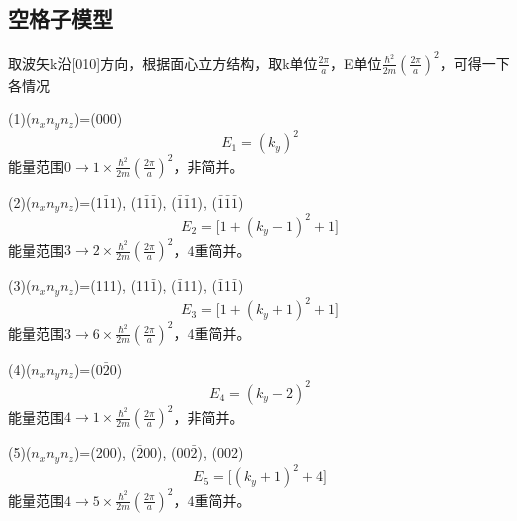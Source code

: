 \documentclass{article}
\begin{document}
\subsection{空格子模型}
取波矢k沿[010]方向，根据面心立方结构，取k单位$ \frac{2\pi}{a} $，E单位$ \frac{\hbar^2}{2m}(\frac{2\pi}{a})^2 $，可得一下各情况


(1)($ n_xn_yn_z $)=(000)
\begin{equation}
	E_1=(k_y)^2
\end{equation}
能量范围$ 0\rightarrow 1 \times \frac{\hbar^2}{2m}(\frac{2\pi}{a})^2 $，非简并。


(2)($ n_xn_yn_z $)=(1$\bar{1}1$), (1$\bar{1}$$\bar{1}$), ($\bar{1}$$\bar{1}$1), ($\bar{1}$$\bar{1}$$\bar{1}$)
\begin{equation}
	E_2=\big[1+(k_y-1)^2+1\big]
\end{equation}
能量范围$ 3\rightarrow 2 \times \frac{\hbar^2}{2m}(\frac{2\pi}{a})^2 $，4重简并。


(3)($ n_xn_yn_z $)=(111), (11$\bar{1}$), ($\bar{1}$11), ($\bar{1}$1$\bar{1}$)
\begin{equation}
	E_3=\big[1+(k_y+1)^2+1\big]
\end{equation}
能量范围$ 3\rightarrow 6 \times \frac{\hbar^2}{2m}(\frac{2\pi}{a})^2 $，4重简并。


(4)($ n_xn_yn_z $)=(0$\bar{2}0$)
\begin{equation}
	E_4=(k_y-2)^2
\end{equation}
能量范围$ 4\rightarrow 1 \times \frac{\hbar^2}{2m}(\frac{2\pi}{a})^2 $，非简并。


(5)($ n_xn_yn_z $)=(200), ($\bar{2}$00), (00$\bar{2}$), (002)
\begin{equation}
	E_5=\big[(k_y+1)^2+4\big]
\end{equation}
能量范围$ 4\rightarrow 5 \times \frac{\hbar^2}{2m}(\frac{2\pi}{a})^2 $，4重简并。
\end{document}
